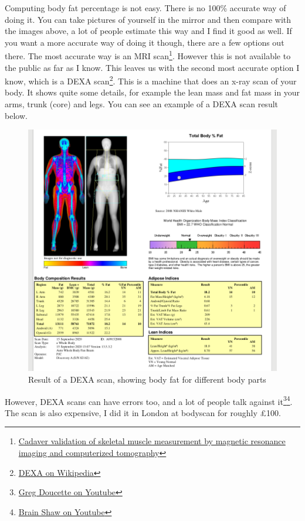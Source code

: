 \documentclass[openany, 12pt]{book}
\begin{document}
	Computing body fat percentage is not easy. There is no 100\% accurate way of doing it. You can take pictures of yourself in the mirror and then compare with the images above, a lot of people estimate this way and I find it good as well. If you want a more accurate way of doing it though, there are a few options out there. The most accurate way is an MRI scan\footnote{\href{https://pubmed.ncbi.nlm.nih.gov/9655763/}{Cadaver validation of skeletal muscle measurement by magnetic resonance imaging and computerized tomography}}. However this is not available to the public as far as I know. This leaves us with the second most accurate option I know, which is a DEXA scan\footnote{\href{https://en.wikipedia.org/wiki/Dual-energy_X-ray_absorptiometry}{DEXA on Wikipedia}}. This is a machine that does an x-ray scan of your body. It shows quite some details, for example the lean mass and fat mass in your arms, trunk (core) and legs. You can see an example of a DEXA scan result below.
	\begin{figure}[h]
		\centering
		\includegraphics[scale=0.5]{dexa-scan.png}
		\caption{Result of a DEXA scan, showing body fat for different body parts}
	\end{figure}
However, DEXA scans can have errors too, and a lot of people talk against it\footnote{\href{https://www.youtube.com/watch?v=2Gg4Jm5KS1Y}{Greg Doucette on Youtube}}\footnote{\href{https://www.youtube.com/watch?v=P17bcpYE8Ew}{Brain Shaw on Youtube}}. The scan is also expensive, I did it in London at bodyscan for roughly \pounds 100.
	
\end{document}
